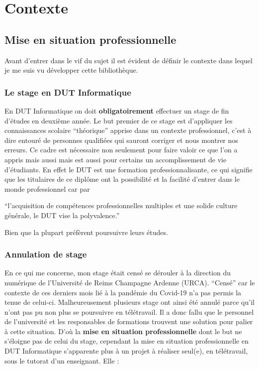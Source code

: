 \documentclass[11pt,a4paper,krantz2,11pt,oneside]{krantz}
\renewenvironment{quote}{\begin{VF}}{\end{VF}}
\begin{document}
\hypertarget{context}{%
\chapter{Contexte}\label{context}}

\hypertarget{mise-en-situation-professionnelle}{%
\section{Mise en situation professionnelle}\label{mise-en-situation-professionnelle}}

Avant d'entrer dans le vif du sujet il est évident de définir le contexte dans lequel je me suis vu développer cette bibliothèque.

\hypertarget{le-stage-en-dut-informatique}{%
\subsection{Le stage en DUT Informatique}\label{le-stage-en-dut-informatique}}

En DUT Informatique on doit \textbf{obligatoirement} effectuer un stage de fin d'études en deuxième année. Le but premier de ce stage est d'appliquer les connaissances scolaire ``théorique'' apprise dans un contexte professionnel, c'est à dire entouré de personnes qualifiées qui sauront corriger et nous montrer nos erreurs. Ce cadre est nécessaire non seulement pour faire valoir ce que l'on a appris mais aussi mais est aussi pour certains un accomplissement de vie d'étudiants. En effet le DUT est une formation professionnalisante, ce qui signifie que les titulaires de ce diplôme ont la possibilité et la facilité d'entrer dans le monde professionnel car par

\begin{quote}
``l'acquisition de compétences professionnelles multiples et une solide culture générale, le DUT vise la polyvalence.''

\end{quote}

Bien que la plupart préfèrent poursuivre leurs études.

\hypertarget{annulation-de-stage}{%
\subsection{Annulation de stage}\label{annulation-de-stage}}

En ce qui me concerne, mon stage était censé se dérouler à la direction du numérique de l'Université de Reims Champagne Ardenne (URCA). ``Censé'' car le contexte de ces derniers mois lié à la pandémie du Covid-19 n'a pas permis la tenue de celui-ci. Malheureusement plusieurs stage ont ainsi été annulé parce qu'il n'ont pas pu non plus se poursuivre en télétravail. Il a donc fallu que le personnel de l'université et les responsables de formations trouvent une solution pour palier à cette situation. D'où la \textbf{mise en situation professionnelle} dont le but ne s'éloigne pas de celui du stage, cependant la mise en situation professionnelle en DUT Informatique s'apparente plus à un projet à réaliser seul(e), en télétravail, sous le tutorat d'un enseignant. Elle :
\end{document}
